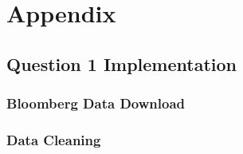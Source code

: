 \documentclass[10pt]{article}
\newcommand*\lstinputpath[1]{\lstset{inputpath=#1}} %
\begin{document}

\newpage

\printbibliography



\newpage

\appendix

\lstinputpath{}

\section{Appendix} \label{appendix:source}

    \subsection{Question 1 Implementation}

        \subsubsection{Bloomberg Data Download} \label{appendix:source:q1:bloomberg}

            
        
        \subsubsection{Data Cleaning} \label{appendix:source:q1:clean}
        
            
    
\end{document}
